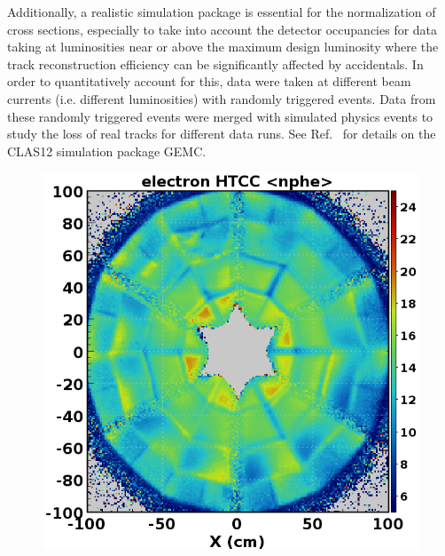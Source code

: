 \documentclass[final,3p,twocolumn]{elsarticle}
\begin{document}
\begin{figure}[htbp!]
\label{gemc-event}
\end{figure}

Additionally, a realistic simulation package is essential for the normalization of cross sections, especially to take
into account the detector occupancies for data taking at luminosities near or above the maximum design luminosity
where the track reconstruction efficiency can be significantly affected by accidentals. In order to quantitatively
account for this, data were taken at different beam currents (i.e. different luminosities) with randomly triggered
events. Data from these randomly triggered events were merged with simulated physics events to study the loss
of real tracks for different data runs. See Ref.~\cite{GEMC} for details on the CLAS12 simulation package GEMC.

\begin{figure}[t!]
\centerline{\includegraphics[width=0.95\columnwidth]{e_HTCCnphe.png}
}
\end{figure}
\end{document}

